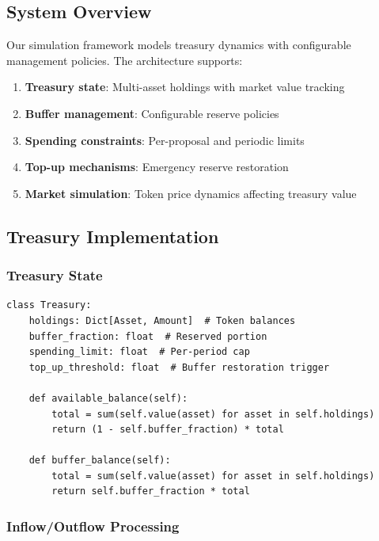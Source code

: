 
\subsection{System Overview}

Our simulation framework models treasury dynamics with configurable management policies. The architecture supports:

\begin{enumerate}
    \item \textbf{Treasury state}: Multi-asset holdings with market value tracking
    \item \textbf{Buffer management}: Configurable reserve policies
    \item \textbf{Spending constraints}: Per-proposal and periodic limits
    \item \textbf{Top-up mechanisms}: Emergency reserve restoration
    \item \textbf{Market simulation}: Token price dynamics affecting treasury value
\end{enumerate}

\subsection{Treasury Implementation}

\subsubsection{Treasury State}

\begin{lstlisting}[caption=Treasury state model (pseudocode)]
class Treasury:
    holdings: Dict[Asset, Amount]  # Token balances
    buffer_fraction: float  # Reserved portion
    spending_limit: float  # Per-period cap
    top_up_threshold: float  # Buffer restoration trigger

    def available_balance(self):
        total = sum(self.value(asset) for asset in self.holdings)
        return (1 - self.buffer_fraction) * total

    def buffer_balance(self):
        total = sum(self.value(asset) for asset in self.holdings)
        return self.buffer_fraction * total
\end{lstlisting}

\subsubsection{Inflow/Outflow Processing}

